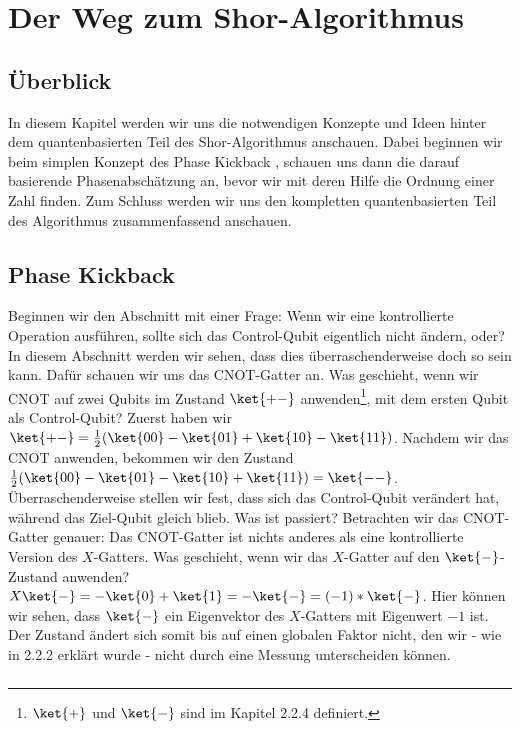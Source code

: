 \chapter{Der Weg zum Shor-Algorithmus}
\section{Überblick}
In diesem Kapitel werden wir uns die notwendigen Konzepte und Ideen hinter dem quantenbasierten Teil des Shor-Algorithmus anschauen. Dabei beginnen wir beim simplen Konzept des \grqq Phase Kickback\grqq{} , schauen uns dann die darauf basierende Phasenabschätzung an, bevor wir mit deren Hilfe die Ordnung einer Zahl finden. Zum Schluss werden wir uns den kompletten quantenbasierten Teil des Algorithmus zusammenfassend anschauen.
\section{Phase Kickback}
Beginnen wir den Abschnitt mit einer Frage: Wenn wir eine kontrollierte Operation ausführen, sollte sich das Control-Qubit eigentlich nicht ändern, oder? In diesem Abschnitt werden wir sehen, dass dies überraschenderweise doch so sein kann. Dafür schauen wir uns das CNOT-Gatter an. Was geschieht, wenn wir CNOT auf zwei Qubits im Zustand $\ket{+-}$ anwenden\footnote{$\ket{+}$ und $\ket{-}$ sind im Kapitel 2.2.4 definiert.}, mit dem ersten Qubit als Control-Qubit? Zuerst haben wir $\ket{+-} = \frac{1}{2}(\ket{00} - \ket{01} + \ket{10} - \ket{11})$. Nachdem wir das CNOT anwenden, bekommen wir den Zustand $\frac{1}{2}(\ket{00} - \ket{01} - \ket{10} + \ket{11}) = \ket{--}$. Überraschenderweise stellen wir fest, dass sich das Control-Qubit verändert hat, während das Ziel-Qubit gleich blieb. Was ist passiert? Betrachten wir das CNOT-Gatter genauer: Das CNOT-Gatter ist nichts anderes als eine kontrollierte Version des $X$-Gatters. Was geschieht, wenn wir das $X$-Gatter auf den $\ket{-}$-Zustand anwenden? $X\ket{-} = -\ket{0} + \ket{1} = -\ket{-} = (-1)*\ket{-}$. Hier können wir sehen, dass $\ket{-}$ ein Eigenvektor des $X$-Gatters mit Eigenwert $-1$ ist. Der Zustand ändert sich somit bis auf einen globalen Faktor nicht, den wir - wie in 2.2.2 erklärt wurde - nicht durch eine Messung unterscheiden können.

\paragraph{}

